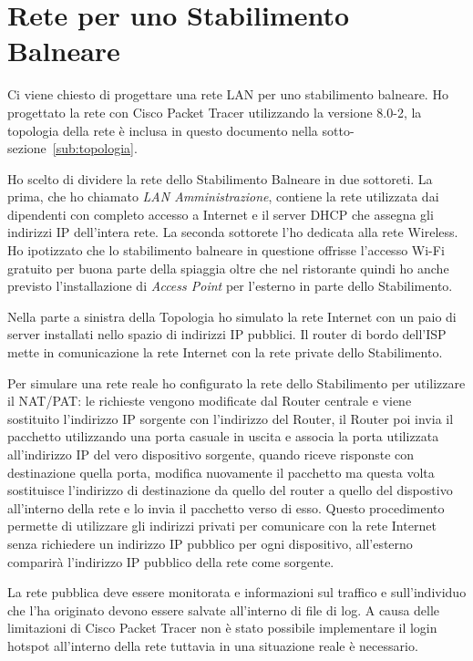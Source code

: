 \section{Rete per uno Stabilimento Balneare}%
\label{sec:rete}

Ci viene chiesto di progettare una rete LAN per uno stabilimento balneare. Ho progettato la rete con Cisco Packet Tracer utilizzando la versione 8.0-2, la topologia della rete \`e inclusa in questo documento nella sotto-sezione~\ref{sub:topologia}.

Ho scelto di dividere la rete dello Stabilimento Balneare in due sottoreti. La prima, che ho chiamato \emph{LAN Amministrazione}, contiene la rete utilizzata dai dipendenti con completo accesso a Internet e il server DHCP che assegna gli indirizzi IP dell'intera rete. La seconda sottorete l'ho dedicata alla rete Wireless. Ho ipotizzato che lo stabilimento balneare in questione offrisse l'accesso Wi-Fi gratuito per buona parte della spiaggia oltre che nel ristorante quindi ho anche previsto l'installazione di \emph{Access Point} per l'esterno in parte dello Stabilimento.

Nella parte a sinistra della Topologia ho simulato la rete Internet con un paio di server installati nello spazio di indirizzi IP pubblici. Il router di bordo dell'ISP mette in comunicazione la rete Internet con la rete private dello Stabilimento.

Per simulare una rete reale ho configurato la rete dello Stabilimento per utilizzare il NAT/PAT\@: le richieste vengono modificate dal Router centrale e viene sostituito l'indirizzo IP sorgente con l'indirizzo del Router, il Router poi invia il pacchetto utilizzando una porta casuale in uscita e associa la porta utilizzata all'indirizzo IP del vero dispositivo sorgente, quando riceve risponste con destinazione quella porta, modifica nuovamente il pacchetto ma questa volta sostituisce l'indirizzo di destinazione da quello del router a quello del dispostivo all'interno della rete e lo invia il pacchetto verso di esso. Questo procedimento permette di utilizzare gli indirizzi privati per comunicare con la rete Internet senza richiedere un indirizzo IP pubblico per ogni dispositivo, all'esterno comparir\`a l'indirizzo IP pubblico della rete come sorgente.

La rete pubblica deve essere monitorata e informazioni sul traffico e sull'individuo che l'ha originato devono essere salvate all'interno di file di log. A causa delle limitazioni di Cisco Packet Tracer non \`e stato possibile implementare il login hotspot all'interno della rete tuttavia in una situazione reale \`e necessario.

